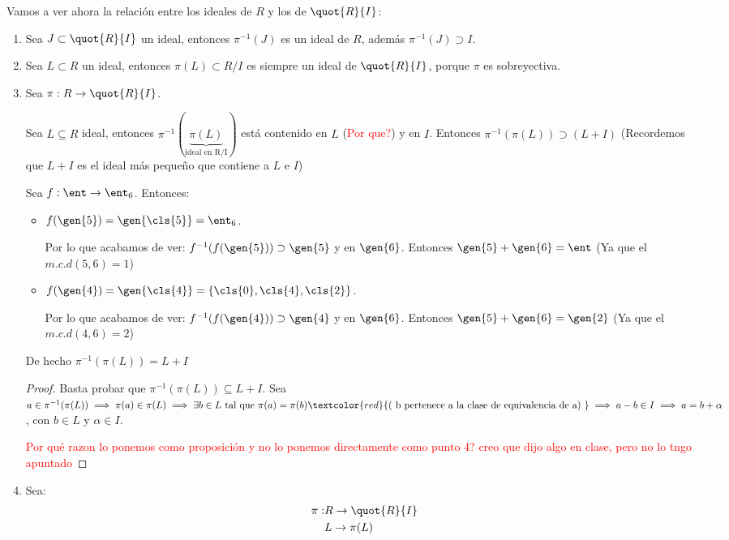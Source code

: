 Vamos a ver ahora la relación entre los ideales de $R$ y los de $\quot{R}{I}$:
\begin{enumerate}
	\item Sea $J \subset \quot{R}{I}$ un ideal, entonces $\pi^{-1}(J)$ es un ideal de $R$, además $\pi^{-1}(J)\supset I$.
	\item Sea $L \subset R$ un ideal, entonces $\pi(L) \subset R/I$ es siempre un ideal de $\quot{R}{I}$, porque $\pi$ es sobreyectiva.
	\item Sea $\pi: R \rightarrow \quot{R}{I}$.

	Sea $L\subseteq R$ ideal, entonces $\pi^{-1}(\underbrace{\pi(L)}_{\text{ideal en R/I}})$ está contenido en $L$ (\textcolor{red}{Por que?}) y en $I$. Entonces $\pi^{-1}(\pi(L)) \supset (L+I)$ (Recordemos que $L+I$ es el ideal más pequeño que contiene a $L$ e $I$)
	\begin{example}
		Sea $f: \ent \rightarrow \ent_6$. Entonces:
		\begin{itemize}
			\item $f(\gen{5})=\gen{\cls{5}}=\ent_6$.

			Por lo que acabamos de ver: $f^{-1}(f(\gen{5})) \supset \gen{5}$ y en $\gen{6}$. Entonces $\gen{5} + \gen{6} = \ent$ (Ya que el $m.c.d(5,6)=1$)
			\item $f(\gen{4})=\gen{\cls{4}}=\{\cls{0},\cls{4},\cls{2} \}$.

			Por lo que acabamos de ver: $f^{-1}(f(\gen{4})) \supset \gen{4}$ y en $\gen{6}$. Entonces $\gen{5} + \gen{6} = \gen{2}$ (Ya que el $m.c.d (4,6)=2$)
		\end{itemize}
	\end{example}

	\begin{prop}
		De hecho $\pi^{-1}(\pi(L)) = L+I$
	\end{prop}
	\begin{proof}
		Basta probar que $\pi^{-1}(\pi(L)) \subseteq L+I$. Sea $a \in \pi^{-1}(\pi(L)) \implies \pi(a) \in \pi(L) \implies \exists b\in L \text{ tal que } \pi(a)=\pi(b) \textcolor{red}{ (\text{ b pertenece a la clase de equivalencia de a) }} \implies a-b \in I  \implies a=b+\alpha$, con $b \in L$ y $\alpha \in I$.

		\textcolor{red}{Por qué razon lo ponemos como proposición y no lo ponemos directamente como punto 4? creo que dijo algo en clase, pero no lo tngo apuntado}
	\end{proof}


	\item Sea:
	\begin{align*}
		\pi:
		& R \rightarrow \quot{R}{I} \\
		& L \rightarrow \pi(L) \\
	\end{align*}


\end{enumerate}
